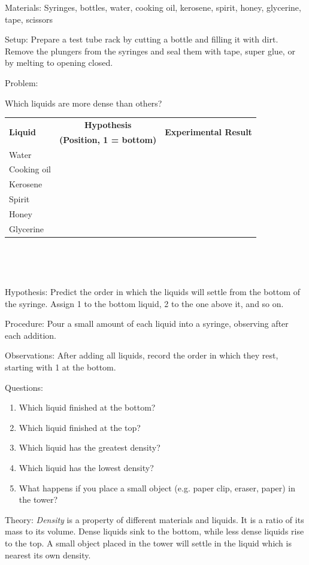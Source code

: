 \begin{description*}
\item[Materials:]{Syringes, bottles, water, cooking oil, kerosene, spirit, honey, glycerine, tape, scissors}
\item[Setup:]{Prepare a test tube rack by cutting a bottle and filling it with dirt. Remove the plungers from the syringes and seal them with tape, super glue, or by melting to opening closed.}\\
\item[Problem:]{Which liquids are more dense than others?\\

\begin{tabular}{|l|c|c|} \hline
\multirow{2}{*}{\textbf{Liquid}} & \textbf{Hypothesis} & \multirow{2}{*}{\textbf{Experimental Result}} \\
& \textbf{(Position, 1 = bottom)} & \\ \hline
Water & & \\ \hline
Cooking oil & & \\ \hline
Kerosene & & \\ \hline
Spirit & & \\ \hline
Honey & & \\ \hline
Glycerine & & \\ \hline
\end{tabular} \\[10pt]
}\\
\item[Hypothesis:]{Predict the order in which the liquids will settle from the bottom of the syringe. Assign 1 to the bottom liquid, 2 to the one above it, and so on.}
\item[Procedure:]{Pour a small amount of each liquid into a syringe, observing after each addition.}
\item[Observations:]{After adding all liquids, record the order in which they rest, starting with 1 at the bottom.}
\item[Questions:]{}\hfill
\begin{enumerate}
\item Which liquid finished at the bottom?
\item Which liquid finished at the top?
\item Which liquid has the greatest density?
\item Which liquid has the lowest density?
\item What happens if you place a small object (e.g. paper clip, eraser, paper) in the tower? 
\end{enumerate}
\item[Theory:]{\emph{Density} is a property of different materials and liquids. It is a ratio of its mass to its volume. Dense liquids sink to the bottom, while less dense liquids rise to the top. A small object placed in the tower will settle in the liquid which is nearest its own density.}
\end{description*}

